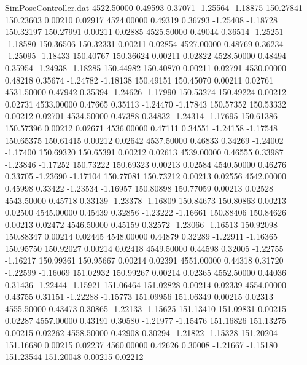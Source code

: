 \begin{filecontents}{SimPoseController.dat}
4522.50000    0.49593    0.37071    -1.25564   -1.18875  150.27841  150.23603    0.00210    0.02917
4524.00000    0.49319    0.36793    -1.25408   -1.18728  150.32197  150.27991    0.00211    0.02885
4525.50000    0.49044    0.36514    -1.25251   -1.18580  150.36506  150.32331    0.00211    0.02854
4527.00000    0.48769    0.36234    -1.25095   -1.18433  150.40767  150.36624    0.00211    0.02822
4528.50000    0.48494    0.35954    -1.24938   -1.18285  150.44982  150.40870    0.00211    0.02791
4530.00000    0.48218    0.35674    -1.24782   -1.18138  150.49151  150.45070    0.00211    0.02761
4531.50000    0.47942    0.35394    -1.24626   -1.17990  150.53274  150.49224    0.00212    0.02731
4533.00000    0.47665    0.35113    -1.24470   -1.17843  150.57352  150.53332    0.00212    0.02701
4534.50000    0.47388    0.34832    -1.24314   -1.17695  150.61386  150.57396    0.00212    0.02671
4536.00000    0.47111    0.34551    -1.24158   -1.17548  150.65375  150.61415    0.00212    0.02642
4537.50000    0.46833    0.34269    -1.24002   -1.17400  150.69320  150.65391    0.00212    0.02613
4539.00000    0.46555    0.33987    -1.23846   -1.17252  150.73222  150.69323    0.00213    0.02584
4540.50000    0.46276    0.33705    -1.23690   -1.17104  150.77081  150.73212    0.00213    0.02556
4542.00000    0.45998    0.33422    -1.23534   -1.16957  150.80898  150.77059    0.00213    0.02528
4543.50000    0.45718    0.33139    -1.23378   -1.16809  150.84673  150.80863    0.00213    0.02500
4545.00000    0.45439    0.32856    -1.23222   -1.16661  150.88406  150.84626    0.00213    0.02472
4546.50000    0.45159    0.32572    -1.23066   -1.16513  150.92098  150.88347    0.00214    0.02445
4548.00000    0.44879    0.32289    -1.22911   -1.16365  150.95750  150.92027    0.00214    0.02418
4549.50000    0.44598    0.32005    -1.22755   -1.16217  150.99361  150.95667    0.00214    0.02391
4551.00000    0.44318    0.31720    -1.22599   -1.16069  151.02932  150.99267    0.00214    0.02365
4552.50000    0.44036    0.31436    -1.22444   -1.15921  151.06464  151.02828    0.00214    0.02339
4554.00000    0.43755    0.31151    -1.22288   -1.15773  151.09956  151.06349    0.00215    0.02313
4555.50000    0.43473    0.30865    -1.22133   -1.15625  151.13410  151.09831    0.00215    0.02287
4557.00000    0.43191    0.30580    -1.21977   -1.15476  151.16826  151.13275    0.00215    0.02262
4558.50000    0.42908    0.30294    -1.21822   -1.15328  151.20204  151.16680    0.00215    0.02237
4560.00000    0.42626    0.30008    -1.21667   -1.15180  151.23544  151.20048    0.00215    0.02212

\end{filecontents}
